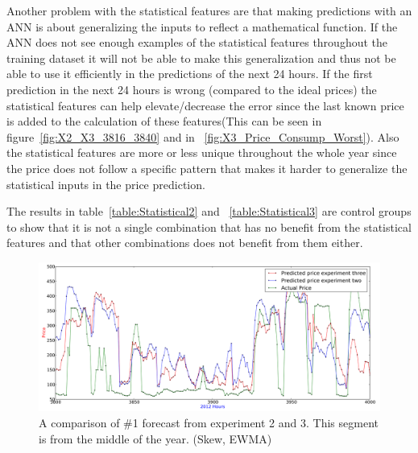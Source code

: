 Another problem with the statistical features are that making predictions with an ANN is about generalizing the inputs to reflect a mathematical function. If the ANN does not see enough examples of the statistical features throughout the training dataset it will not be able to make this generalization and thus not be able to use it efficiently in the predictions of the next 24 hours. If the first prediction in the next 24 hours is wrong (compared to the ideal prices) the statistical features can help elevate/decrease the error since the last known price is added to the calculation of these features(This can be seen in figure~\ref{fig:X2_X3_3816_3840} and in ~\ref{fig:X3_Price_Consump_Worst}). Also the statistical features are more or less unique throughout the whole year since the price does not follow a specific pattern that makes it harder to generalize the statistical inputs in the price prediction. 


The results in table~\ref{table:Statistical2} and ~\ref{table:Statistical3} are control groups to show that it is not a single combination that has no benefit from the statistical features and that other combinations does not benefit from them either.

\begin{figure}[H]
\centering
\includegraphics[width=\linewidth,natwidth=898,natheight=587]{billeder/PriceExperimentalAnalysis/X2_X3_3800_4000.png}
\caption{A comparison of \#1 forecast from experiment 2 and 3. This segment is from the middle of the year. (Skew, EWMA)}
\label{fig:X2_X3_3800_4000}
\end{figure}

